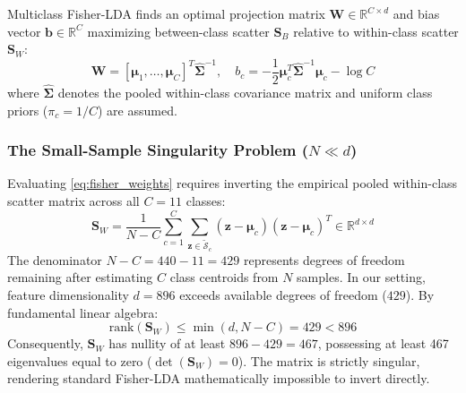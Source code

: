 \documentclass[a4paper,fleqn,nologo]{cas-dc}
\begin{document}
Multiclass Fisher-LDA \cite{fisher1936use, rao1948utilization} finds an optimal projection matrix $\mathbf{W} \in \mathbb{R}^{C \times d}$ and bias vector $\mathbf{b} \in \mathbb{R}^C$ maximizing between-class scatter $\mathbf{S}_B$ relative to within-class scatter $\mathbf{S}_W$:
\begin{equation}
    \label{eq:fisher_weights}
    \mathbf{W} = [\boldsymbol{\mu}_1, \dots, \boldsymbol{\mu}_C]^T \hat{\mathbf{\Sigma}}^{-1}, \quad
    b_c = -\frac{1}{2} \boldsymbol{\mu}_c^T \hat{\mathbf{\Sigma}}^{-1} \boldsymbol{\mu}_c - \log C
\end{equation}
where $\hat{\mathbf{\Sigma}}$ denotes the pooled within-class covariance matrix and uniform class priors ($\pi_c = 1/C$) are assumed.

\subsubsection{The Small-Sample Singularity Problem ($N \ll d$)}
Evaluating \eqref{eq:fisher_weights} requires inverting the empirical pooled within-class scatter matrix across all $C=11$ classes:
\begin{equation}
    \mathbf{S}_W = \frac{1}{N - C}\sum_{c=1}^C \sum_{\mathbf{z} \in \tilde{\mathcal{S}}_c} (\mathbf{z} - \boldsymbol{\mu}_c)(\mathbf{z} - \boldsymbol{\mu}_c)^T \in \mathbb{R}^{d \times d}
\end{equation}
The denominator $N - C = 440 - 11 = 429$ represents degrees of freedom remaining after estimating $C$ class centroids from $N$ samples. In our setting, feature dimensionality $d=896$ exceeds available degrees of freedom ($429$). By fundamental linear algebra:
\begin{equation}
    \text{rank}(\mathbf{S}_W) \le \min(d, N - C) = 429 < 896
\end{equation}
Consequently, $\mathbf{S}_W$ has nullity of at least $896 - 429 = 467$, possessing at least 467 eigenvalues equal to zero ($\det(\mathbf{S}_W) = 0$). The matrix is strictly singular, rendering standard Fisher-LDA mathematically impossible to invert directly.
\end{document}

